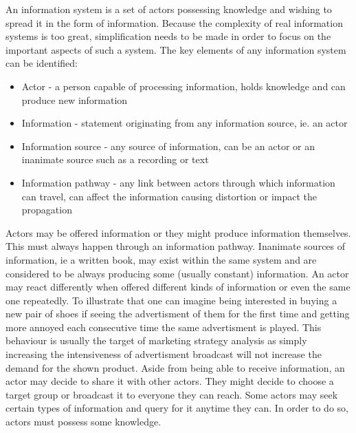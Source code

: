 An information system is a set of actors possessing knowledge and wishing to spread it in the form of information.
Because the complexity of real information systems is too great, simplification needs to be made in order to focus on the important aspects of such a system.
The key elements of any information system can be identified:
\begin{itemize}
    \item Actor - a person capable of processing information, holds knowledge and can produce new information
    \item Information - statement originating from any information source, ie. an actor
    \item Information source - any source of information, can be an actor or an inanimate source such as a recording or text
    \item Information pathway - any link between actors through which information can travel, can affect the information causing distortion or impact the propagation
\end{itemize}
Actors may be offered information or they might produce information themselves.
This must always happen through an information pathway.
Inanimate sources of information, ie a written book, may exist within the same system and are considered to be always producing some (usually constant) information.
An actor may react differently when offered different kinds of information or even the same one repeatedly.
To illustrate that one can imagine being interested in buying a new pair of shoes if seeing the advertisment of them for the first time and getting more annoyed each consecutive time the same advertisment is played.
This behaviour is usually the target of marketing strategy analysis as simply increasing the intensiveness of advertisment broadcast will not increase the demand for the shown product.
Aside from being able to receive information, an actor may decide to share it with other actors.
They might decide to choose a target group or broadcast it to everyone they can reach.
Some actors may seek certain types of information and query for it anytime they can.
In order to do so, actors must possess some knowledge.

